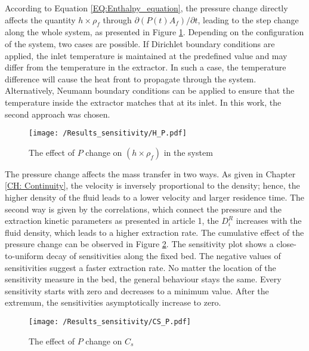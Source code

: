 \documentclass[../Article_Model_Parameters.tex]{subfiles}
\begin{document}
	According to Equation \ref{EQ:Enthalpy_equation}, the pressure change directly affects the quantity $h \times \rho_f$ through $\partial (P(t) A_f) / \partial t$, leading to the step change along the whole system, as presented in Figure \ref{fig:Sensitivty_P_H}. Depending on the configuration of the system, two cases are possible. If Dirichlet boundary conditions are applied, the inlet temperature is maintained at the predefined value and may differ from the temperature in the extractor. In such a case, the temperature difference will cause the heat front to propagate through the system. Alternatively, Neumann boundary conditions can be applied to ensure that the temperature inside the extractor matches that at its inlet. In this work, the second approach was chosen.
    
    \begin{figure}[h!]
    	\centering
    	\texttt{[image: /Results\_sensitivity/H\_P.pdf]}
    	\caption{The effect of $P$ change on $(h \times \rho_f)$ in the system}
    	\label{fig:Sensitivty_P_H}
    \end{figure}

	The pressure change affects the mass transfer in two ways. As given in Chapter \ref{CH: Continuity}, the velocity is inversely proportional to the density; hence, the higher density of the fluid leads to a lower velocity and larger residence time. The second way is given by the correlations, which connect the pressure and the extraction kinetic parameters as presented in {\color{red}article 1}, the $D_i^R$ increases with the fluid density, which leads to a higher extraction rate. The cumulative effect of the pressure change can be observed in Figure \ref{fig:Sensitivty_P_CS}. The sensitivity plot shows a close-to-uniform decay of sensitivities along the fixed bed. The negative values of sensitivities suggest a faster extraction rate. No matter the location of the sensitivity measure in the bed, the general behaviour stays the same. Every sensitivity starts with zero and decreases to a minimum value. After the extremum, the sensitivities asymptotically increase to zero.

	\begin{figure}[h!]
		\centering
		\texttt{[image: /Results\_sensitivity/CS\_P.pdf]}
		\caption{The effect of $P$ change on $C_s$}
		\label{fig:Sensitivty_P_CS}
	\end{figure}
\end{document}
